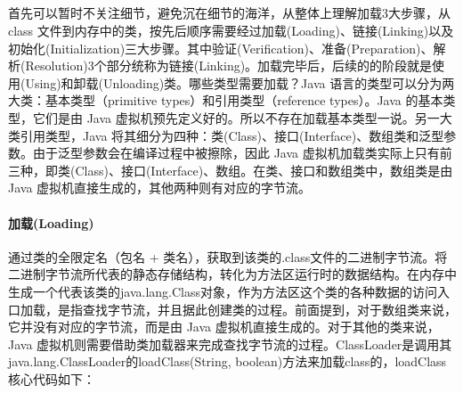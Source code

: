 \documentclass[../../../interview-questions.tex]{subfiles}
\begin{document}
\subsection{\color{red}{Java虚拟机如何加载类(Java类的生命周期)}}

首先可以暂时不关注细节，避免沉在细节的海洋，从整体上理解加载3大步骤，从 class 文件到内存中的类，按先后顺序需要经过加载(Loading)、链接(Linking)以及初始化(Initialization)三大步骤。其中验证(Verification)、准备(Preparation)、解析(Resolution)3个部分统称为链接(Linking)。加载完毕后，后续的的阶段就是使用(Using)和卸载(Unloading)类。哪些类型需要加载？Java 语言的类型可以分为两大类：基本类型（primitive types）和引用类型（reference types）。Java 的基本类型，它们是由 Java 虚拟机预先定义好的。所以不存在加载基本类型一说。另一大类引用类型，Java 将其细分为四种：类(Class)、接口(Interface)、数组类和泛型参数。由于泛型参数会在编译过程中被擦除，因此 Java 虚拟机加载类实际上只有前三种，即类(Class)、接口(Interface)、数组。在类、接口和数组类中，数组类是由 Java 虚拟机直接生成的，其他两种则有对应的字节流。

\paragraph{加载(Loading)}

通过类的全限定名（包名 + 类名），获取到该类的.class文件的二进制字节流。将二进制字节流所代表的静态存储结构，转化为方法区运行时的数据结构。在内存中生成一个代表该类的java.lang.Class对象，作为方法区这个类的各种数据的访问入口加载，是指查找字节流，并且据此创建类的过程。前面提到，对于数组类来说，它并没有对应的字节流，而是由 Java 虚拟机直接生成的。对于其他的类来说，Java 虚拟机则需要借助类加载器来完成查找字节流的过程。ClassLoader是调用其java.lang.ClassLoader的loadClass(String, boolean)方法来加载class的，loadClass核心代码如下：
\end{document}
